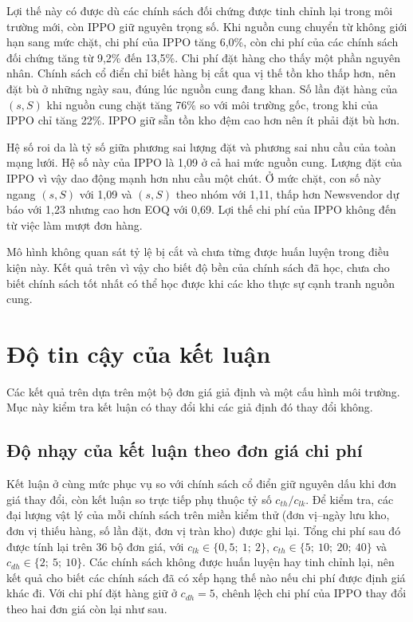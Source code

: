 Lợi thế này có được dù các chính sách đối chứng được tinh chỉnh lại trong môi trường mới, còn IPPO giữ nguyên trọng số. Khi nguồn cung chuyển từ không giới hạn sang mức chặt, chi phí của IPPO tăng 6,0\%, còn chi phí của các chính sách đối chứng tăng từ 9,2\% đến 13,5\%. Chi phí đặt hàng cho thấy một phần nguyên nhân. Chính sách cổ điển chỉ biết hàng bị cắt qua vị thế tồn kho thấp hơn, nên đặt bù ở những ngày sau, đúng lúc nguồn cung đang khan. Số lần đặt hàng của $(s,S)$ khi nguồn cung chặt tăng 76\% so với môi trường gốc, trong khi của IPPO chỉ tăng 22\%. IPPO giữ sẵn tồn kho đệm cao hơn nên ít phải đặt bù hơn.

Hệ số roi da là tỷ số giữa phương sai lượng đặt và phương sai nhu cầu của toàn mạng lưới. Hệ số này của IPPO là 1,09 ở cả hai mức nguồn cung. Lượng đặt của IPPO vì vậy dao động mạnh hơn nhu cầu một chút. Ở mức chặt, con số này ngang $(s,S)$ với 1,09 và $(s,S)$ theo nhóm với 1,11, thấp hơn Newsvendor dự báo với 1,23 nhưng cao hơn EOQ với 0,69. Lợi thế chi phí của IPPO không đến từ việc làm mượt đơn hàng.

Mô hình không quan sát tỷ lệ bị cắt và chưa từng được huấn luyện trong điều kiện này. Kết quả trên vì vậy cho biết độ bền của chính sách đã học, chưa cho biết chính sách tốt nhất có thể học được khi các kho thực sự cạnh tranh nguồn cung.

\section{Độ tin cậy của kết luận}
\label{sec:doTinCay}

Các kết quả trên dựa trên một bộ đơn giá giả định và một cấu hình môi trường. Mục này kiểm tra kết luận có thay đổi khi các giả định đó thay đổi không.

\subsection{Độ nhạy của kết luận theo đơn giá chi phí}
\label{subsec:doNhay}

Kết luận ở cùng mức phục vụ so với chính sách cổ điển giữ nguyên dấu khi đơn giá thay đổi, còn kết luận so trực tiếp phụ thuộc tỷ số $c_{th}/c_{lk}$. Để kiểm tra, các đại lượng vật lý của mỗi chính sách trên miền kiểm thử (đơn vị--ngày lưu kho, đơn vị thiếu hàng, số lần đặt, đơn vị tràn kho) được ghi lại. Tổng chi phí sau đó được tính lại trên 36 bộ đơn giá, với $c_{lk} \in \{0{,}5;\ 1;\ 2\}$, $c_{th} \in \{5;\ 10;\ 20;\ 40\}$ và $c_{dh} \in \{2;\ 5;\ 10\}$. Các chính sách không được huấn luyện hay tinh chỉnh lại, nên kết quả cho biết các chính sách đã có xếp hạng thế nào nếu chi phí được định giá khác đi. Với chi phí đặt hàng giữ ở $c_{dh} = 5$, chênh lệch chi phí của IPPO thay đổi theo hai đơn giá còn lại như sau.

